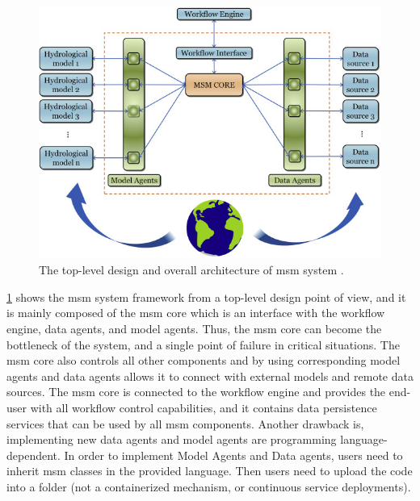 \begin{figure}[htp]
    \centering
    \includegraphics[width=1\textwidth]{lit/other/msm_architecture.jpg}
    \caption[The top-level design and overall architecture of \acrshort{msm} system]{The top-level design and overall architecture of \acrshort{msm} system \cite{Salas2020AnApplication}.}
    \label{fi:msm_architecture}
\end{figure}

\cref{fi:msm_architecture} shows the \acrshort{msm} system framework from a top-level design point of view, and it is mainly composed of the \acrshort{msm} core which is an interface with the workflow engine, data agents, and model agents. Thus, the \acrshort{msm} core can become the bottleneck of the system, and a single point of failure in critical situations. The \acrshort{msm} core also controls all other components and by using corresponding model agents and data agents allows it to connect with external models and remote data sources. The \acrshort{msm} core is connected to the workflow engine and provides the end-user with all workflow control capabilities, and it contains data persistence services that can be used by all \acrshort{msm} components. Another drawback is, implementing new data agents and model agents are programming language-dependent. In order to implement Model Agents and Data agents, users need to inherit \acrshort{msm} classes in the provided language. Then users need to upload the code into a folder (not a containerized mechanism, or continuous service deployments).

